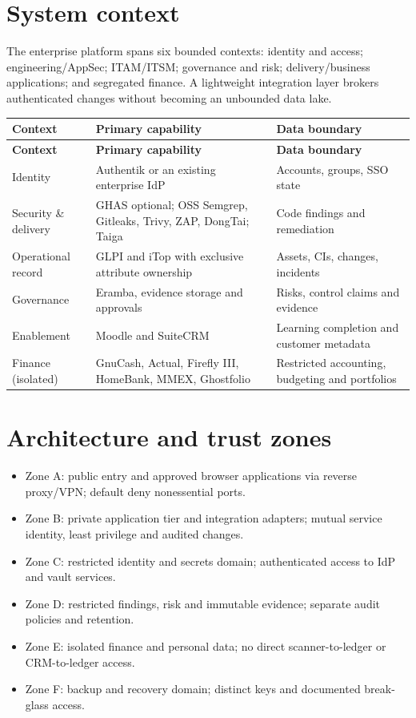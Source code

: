 \documentclass[10pt,letterpaper]{article}
\begin{document}
\section{System context}
The enterprise platform spans six bounded contexts: identity and access; engineering/AppSec; ITAM/ITSM; governance and risk; delivery/business applications; and segregated finance. A lightweight integration layer brokers authenticated changes without becoming an unbounded data lake.\par
\small\begin{longtable}{>{\raggedright\arraybackslash}p{}>{\raggedright\arraybackslash}p{}>{\raggedright\arraybackslash}p{}}
\toprule
\textbf{Context} & \textbf{Primary capability} & \textbf{Data boundary}\\
\midrule\endfirsthead
\toprule
\textbf{Context} & \textbf{Primary capability} & \textbf{Data boundary}\\
\midrule\endhead
Identity & Authentik or an existing enterprise IdP & Accounts, groups, SSO state\\
Security \& delivery & GHAS optional; OSS Semgrep, Gitleaks, Trivy, ZAP, DongTai; Taiga & Code findings and remediation\\
Operational record & GLPI and iTop with exclusive attribute ownership & Assets, CIs, changes, incidents\\
Governance & Eramba, evidence storage and approvals & Risks, control claims and evidence\\
Enablement & Moodle and SuiteCRM & Learning completion and customer metadata\\
Finance (isolated) & GnuCash, Actual, Firefly III, HomeBank, MMEX, Ghostfolio & Restricted accounting, budgeting and portfolios\\
\bottomrule
\end{longtable}
\normalsize
\section{Architecture and trust zones}
\begin{itemize}
\item Zone A: public entry and approved browser applications via reverse proxy/VPN; default deny nonessential ports.
\item Zone B: private application tier and integration adapters; mutual service identity, least privilege and audited changes.
\item Zone C: restricted identity and secrets domain; authenticated access to IdP and vault services.
\item Zone D: restricted findings, risk and immutable evidence; separate audit policies and retention.
\item Zone E: isolated finance and personal data; no direct scanner-to-ledger or CRM-to-ledger access.
\item Zone F: backup and recovery domain; distinct keys and documented break-glass access.
\end{itemize}
\end{document}
